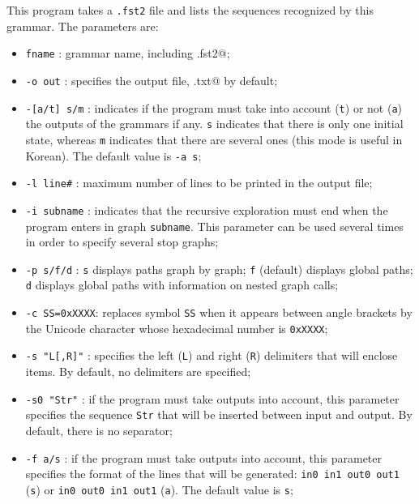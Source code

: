 \bigskip
\noindent This program takes a \verb+.fst2+ file and lists the sequences
recognized by this grammar. The parameters are:

\begin{itemize}
  \item \verb$fname$ : grammar name, including \verb@.fst2@;
  \item \verb$-o out$ : specifies the output file, \verb@lst.txt@ by default;
  \item \verb$-[a/t] s/m$ : indicates if the program must take into account
  (\verb$t$) or not (\verb$a$) the outputs of the grammars if any. \verb$s$
  indicates that there is only one initial state, whereas \verb$m$ indicates that
  there are several ones (this mode is useful in Korean). The default value is
  \verb$-a s$;

  \item \verb$-l line#$ : maximum number of lines to be printed in the output file;
  \item \verb$-i subname$ : indicates that the recursive exploration must end
  when the program enters in graph \verb$subname$. This parameter can be used
  several times in order to specify several stop graphs;

  \item \verb$-p s/f/d$ : \verb$s$ displays paths graph by graph; \verb$f$
  (default) displays global paths; \verb$d$ displays global paths with
  information on nested graph calls;

  \item \verb$-c SS=0xXXXX$: replaces symbol \verb$SS$ when it appears between
  angle brackets by the Unicode character whose hexadecimal number is
  \verb$0xXXXX$;

  \item \verb$-s "L[,R]"$ : specifies the left (\verb$L$) and right (\verb$R$)
  delimiters that will enclose items. By default, no delimiters are specified;

  \item \verb$-s0 "Str"$ : if the program must take  outputs into account, this
  parameter specifies the sequence \verb$Str$ that will be inserted between input
  and output. By default, there is no separator;

  \item \verb$-f a/s$ : if the program must take  outputs into account, this
  parameter specifies the format of the lines that will be generated:
  \verb$in0 in1 out0 out1$ (\verb$s$) or \verb$in0 out0 in1 out1$ (\verb$a$). The default
  value is \verb$s$;


\end{itemize}
